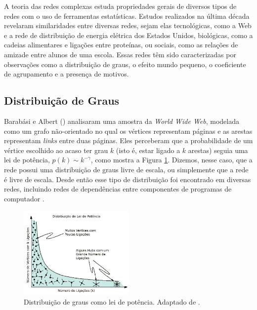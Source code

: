 \documentclass{article}
\begin{document}
A teoria das redes complexas estuda propriedades gerais de diversos tipos de redes com o uso de ferramentas estatísticas. Estudos realizados na última década revelaram similaridades entre diversas redes, sejam elas tecnológicas, como a Web e a rede de distribuição de energia elétrica dos Estados Unidos, biológicas, como a cadeias alimentares e ligações entre proteínas, ou sociais, como as relações de amizade entre alunos de uma escola. Essas redes têm sido caracterizadas por observações como a distribuição de graus, o efeito mundo pequeno, o coeficiente de agrupamento e a presença de motivos.

\subsection{Distribuição de Graus}

Barabási e Albert (\citeyear{Barabasi1999}) analisaram uma amostra da \textit{World Wide Web}, modelada como um grafo não-orientado no qual os vértices representam páginas e as arestas representam \textit{links} entre duas páginas. Eles perceberam que a probabilidade de um vértice escolhido ao acaso ter grau $k$ (isto é, estar ligado a $k$ arestas) seguia uma lei de potência, $p(k) \sim k^{-\gamma}$, como mostra a Figura \ref{fig:leidepotencia}. Dizemos, nesse caso, que a rede possui uma distribuição de graus livre de escala, ou simplemente que a rede é livre de escala. Desde então esse tipo de distribuição foi encontrado em diversas redes, incluindo redes de dependências entre componentes de programas de computador \cite{Valverde2003}.

\begin{figure} \label{fig:leidepotencia}
\centering
\includegraphics[width=0.5\textwidth]{leidepotencia}
\caption{Distribuição de graus como lei de potência. Adaptado de \cite{Barabasi2007}.}
\end{figure}
\end{document}
